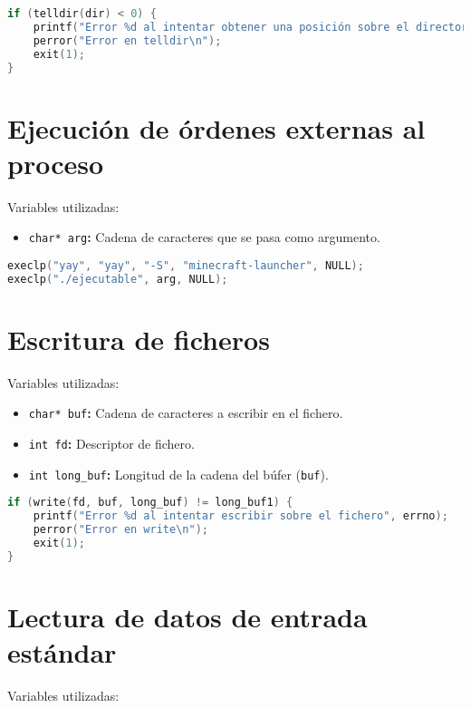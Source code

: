 \begin{lstlisting}[language=C]
if (telldir(dir) < 0) {
	printf("Error %d al intentar obtener una posición sobre el directorio", errno);
	perror("Error en telldir\n");
	exit(1);
}
\end{lstlisting}

\pagebreak

\section{Ejecución de órdenes externas al proceso}

Variables utilizadas:

\begin{itemize}
	\item\texttt{char* arg}\textbf{:} Cadena de caracteres que se pasa como argumento.
\end{itemize}

\begin{lstlisting}[language=C]
execlp("yay", "yay", "-S", "minecraft-launcher", NULL);
execlp("./ejecutable", arg, NULL);
\end{lstlisting}

\section{Escritura de ficheros}

Variables utilizadas:

\begin{itemize}
	\item\texttt{char* buf}\textbf{:} Cadena de caracteres a escribir en el fichero.
	\item\texttt{int fd}\textbf{:} Descriptor de fichero.
	\item\texttt{int long\_buf}\textbf{:} Longitud de la cadena del  búfer (\texttt{buf}).
\end{itemize}

\begin{lstlisting}[language=C]
if (write(fd, buf, long_buf) != long_buf1) {
	printf("Error %d al intentar escribir sobre el fichero", errno);
	perror("Error en write\n");
	exit(1);
}
\end{lstlisting}

\section{Lectura de datos de entrada estándar}

Variables utilizadas:

